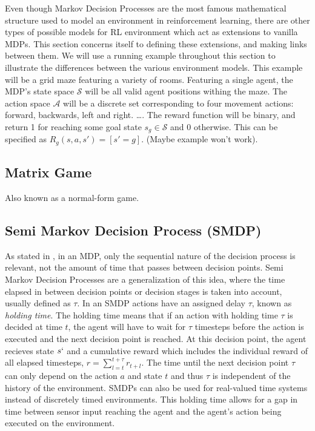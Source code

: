 \documentclass{../main.tex}{subfile}
\begin{document}
Even though Markov Decision Processes are the most famous mathematical structure used to model an environment in reinforcement learning, there are other types of possible models for RL environment which act as extensions to vanilla MDPs. This section concerns itself to defining these extensions, and making links between them. We will use a running example throughout this section to illustrate the differences between the various environment models. This example will be a grid maze featuring a variety of rooms. Featuring a single agent, the MDP's state space $\mathcal{S}$ will be all valid agent positions withing the maze. The action space $\mathcal{A}$ will be a discrete set corresponding to four movement actions: forward, backwards, left and right. \ldots. The reward function will be binary, and return 1 for reaching some goal state $s_g \in \mathcal{S}$ and 0 otherwise. This can be specified as $R_g(s,a,s') = [s' = g]$. (Maybe example won't work). 

\subsection{Matrix Game}
Also known as a normal-form game.
\subsection{Semi Markov Decision Process (SMDP)}

As stated in \citep{Barto2003}, in an MDP, only the sequential nature of the decision process is relevant, not the amount of time that passes between decision points. Semi Markov Decision Processes are a generalization of this idea, where the time elapsed in between decision points or decision stages is taken into account, usually defined as $\tau$. In an SMDP actions have an assigned delay $\tau$, known as \textit{holding time}. The holding time means that if an action with holding time $\tau$ is decided at time $t$, the agent will have to wait for $\tau$ timesteps before the action is executed and the next decision point is reached. At this decision point, the agent recieves state $s`$ and a cumulative reward which includes the individual reward of all elapsed timesteps, $r = \sum_{l=t}^{t+\tau}r_{t+l}$. The time until the next decision point $\tau$ can only depend on the action $a$ and state $t$ and thus $\tau$ is independent of the history of the environment. SMDPs can also be used for real-valued time systems instead of discretely timed environments. This holding time allows for a gap in time between sensor input reaching the agent and the agent's action being executed on the environment.
\end{document}
